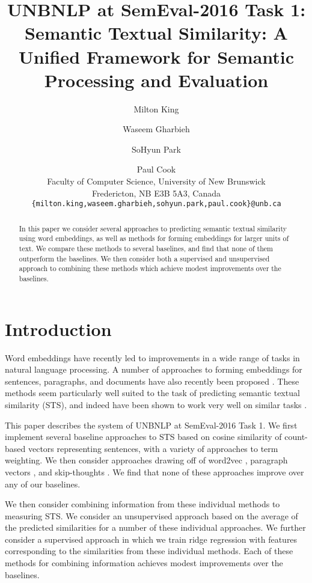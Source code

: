 \documentclass[11pt,letterpaper]{article}
\title{UNBNLP at SemEval-2016 Task 1: Semantic Textual Similarity: A
  Unified Framework for Semantic Processing and Evaluation}
\author{Milton King \and Waseem Gharbieh \and SoHyun Park \and Paul Cook
  \\ Faculty of Computer Science, University of New Brunswick\\
Fredericton, NB E3B 5A3, Canada\\
{\tt \{milton.king,waseem.gharbieh,sohyun.park,paul.cook\}@unb.ca}}
\date{}
\begin{document}
\maketitle

\begin{abstract}
In this paper we consider several approaches to predicting semantic
textual similarity using word embeddings, as well as methods for
forming embeddings for larger units of text. We compare these methods
to several baselines, and find that none of them outperform the
baselines. We then consider both a supervised and unsupervised
approach to combining these methods which achieve modest improvements
over the baselines.
\end{abstract}

\section{Introduction}

Word embeddings \citep{Mikolov+:2013a} have recently led to
improvements in a wide range of tasks in natural language
processing. A number of approaches to forming embeddings for
sentences, paragraphs, and documents have also recently been proposed
\citep[e.g.,][]{Le:Mikolov:2014, Kiros+:2015}. These methods seem
particularly well suited to the task of predicting semantic textual
similarity (STS), and indeed have been shown to work very well on
similar tasks \citep{Kiros+:2015}.

This paper describes the system of UNBNLP at SemEval-2016 Task 1. We
first implement several baseline approaches to STS based on cosine
similarity of count-based vectors representing sentences, with a
variety of approaches to term weighting. We then consider approaches
drawing off of word2vec \citep{Mikolov+:2013a}, paragraph vectors
\citep{Le:Mikolov:2014}, and skip-thoughts \citep{Kiros+:2015}. We
find that none of these approaches improve over any of our baselines.

We then consider combining information from these individual methods
to measuring STS. We consider an unsupervised approach based on the
average of the predicted similarities for a number of these individual
approaches. We further consider a supervised approach in which we
train ridge regression with features corresponding to the similarities
from these individual methods. Each of these methods for combining
information achieves modest improvements over the baselines.
\end{document}
